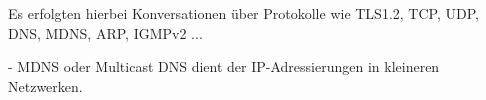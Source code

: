\documentclass[11pt]{article}
\begin{document}
\begin{enumerate}
\begin{enumerate}[\thesection .1]
            Es erfolgten hierbei Konversationen über Protokolle wie TLS1.2, TCP, UDP, DNS, MDNS, ARP, IGMPv2 ...
            \begin{addmargin}[1em]{1em}
                - MDNS oder Multicast DNS dient der IP-Adressierungen in kleineren Netzwerken.
            \end{addmargin}

        \end{enumerate}

    \end{enumerate}
\end{document}
